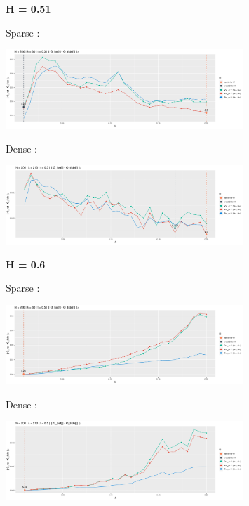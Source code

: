 \begin{figure}[H]
	\centering
	\textbf{ H = 0.51 }

	Sparse :

	\includegraphics[width=0.8\textwidth]{Images/risque/N200_t0.3_lbd60.jpg}

	Dense :

	\includegraphics[width=0.8\textwidth]{Images/risque/N200_t0.3_lbd210.jpg}
\end{figure}

\begin{figure}[H]
	\centering
	\textbf{ H = 0.6 }

	Sparse :

	\includegraphics[width=0.8\textwidth]{Images/risque/N200_t0.5_lbd60.jpg}

	Dense :

	\includegraphics[width=0.8\textwidth]{Images/risque/N200_t0.5_lbd210.jpg}
\end{figure}


